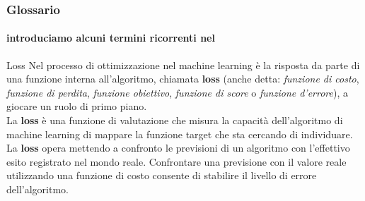 \begin{frame}

	\frametitle{Glossario}
	\framesubtitle{introduciamo alcuni termini ricorrenti nel \ml}

	\begin{block}{Loss}
		Nel processo di ottimizzazione nel machine learning è la risposta da parte di una funzione interna all’algoritmo, chiamata \textbf{loss} (anche detta: \textit{funzione di costo}, \textit{funzione di perdita}, \textit{funzione obiettivo}, \textit{funzione di score} o \textit{funzione d’errore}), a giocare un ruolo di primo piano.\\
		\vspace{3mm}
		La \textbf{loss} è una funzione di valutazione che misura la capacità dell’algoritmo di machine learning di mappare la funzione target che sta cercando di individuare.\\
		\vspace{3mm}
		La \textbf{loss} opera mettendo a confronto le previsioni di un algoritmo con l’effettivo esito registrato nel mondo reale. Confrontare una previsione con il valore reale utilizzando una funzione di costo consente di stabilire il livello di errore dell’algoritmo.%
	\end{block}

\end{frame}


